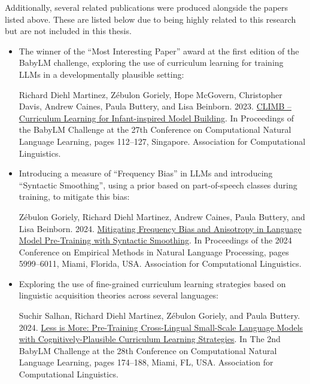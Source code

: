 Additionally, several related publications were produced alongside the papers listed above. These are listed below due to being highly related to this research but are not included in this thesis.

\begin{itemize}
\item The winner of the \enquote{Most Interesting Paper} award at the first edition of the BabyLM challenge, exploring the use of curriculum learning for training LLMs in a developmentally plausible setting:
\begin{mdframed}[linewidth=1pt]
    Richard Diehl Martinez, Zébulon Goriely, Hope McGovern, Christopher Davis, Andrew Caines, Paula Buttery, and Lisa Beinborn. 2023. \href{https://aclanthology.org/2023.conll-babylm.10/}{CLIMB – Curriculum Learning for Infant-inspired Model Building}. In Proceedings of the BabyLM Challenge at the 27th Conference on Computational Natural Language Learning, pages 112–127, Singapore. Association for Computational Linguistics.
\end{mdframed}

\item Introducing a measure of \enquote{Frequency Bias} in LLMs and introducing \enquote{Syntactic Smoothing}, using a prior based on part-of-speech classes during training, to mitigate this bias:
\begin{mdframed}[linewidth=1pt]
    Zébulon Goriely, Richard Diehl Martinez, Andrew Caines, Paula Buttery, and Lisa Beinborn. 2024. \href{https://aclanthology.org/2024.emnlp-main.344/}{Mitigating Frequency Bias and Anisotropy in Language Model Pre-Training with Syntactic Smoothing}. In Proceedings of the 2024 Conference on Empirical Methods in Natural Language Processing, pages 5999–6011, Miami, Florida, USA. Association for Computational Linguistics.
\end{mdframed}

\item Exploring the use of fine-grained curriculum learning strategies based on linguistic acquisition theories across several languages:
\begin{mdframed}[linewidth=1pt]
    Suchir Salhan, Richard Diehl Martinez, Zébulon Goriely, and Paula Buttery. 2024. \href{https://aclanthology.org/2024.conll-babylm.15/}{Less is More: Pre-Training Cross-Lingual Small-Scale Language Models with Cognitively-Plausible Curriculum Learning Strategies}. In The 2nd BabyLM Challenge at the 28th Conference on Computational Natural Language Learning, pages 174–188, Miami, FL, USA. Association for Computational Linguistics.
\end{mdframed}


\end{itemize}
